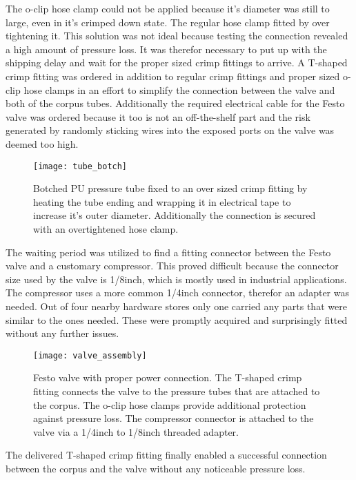 The o-clip hose clamp could not be applied because it's diameter was still to large, even in it's crimped down state. The regular hose clamp fitted by over tightening it. This solution was not ideal because testing the connection revealed a high amount of pressure loss. It was therefor necessary to put up with the shipping delay and wait for the proper sized crimp fittings to arrive. A T-shaped crimp fitting was ordered in addition to regular crimp fittings and proper sized o-clip hose clamps in an effort to simplify the connection between the valve and both of the corpus tubes. Additionally the required electrical cable for the Festo valve was ordered because it too is not an off-the-shelf part and the risk generated by randomly sticking wires into the exposed ports on the valve was deemed too high.


\begin{figure}[h]
\centering

\texttt{[image: tube\_botch]}

\caption{Botched PU pressure tube fixed to an over sized crimp fitting by heating the tube ending and wrapping it in electrical tape to increase it's outer diameter. Additionally the connection is secured with an overtightened hose clamp.}
\end{figure}

The waiting period was utilized to find a fitting connector between the Festo valve and a customary compressor. This proved difficult because the connector size used by the valve is 1/8inch, which is mostly used in industrial applications. The compressor uses a more common 1/4inch connector, therefor an adapter was needed. Out of four nearby hardware stores only one carried any parts that were similar to the ones needed. These were promptly acquired and surprisingly fitted without any further issues.

\begin{figure}[h]
\centering

\texttt{[image: valve\_assembly]}

\caption{Festo valve with proper power connection. The T-shaped crimp fitting connects the valve to the pressure tubes that are attached to the corpus. The o-clip hose clamps provide additional protection against pressure loss. The compressor connector is attached to the valve via a 1/4inch to 1/8inch threaded adapter.}
\end{figure}

The delivered T-shaped crimp fitting finally enabled a successful connection between the corpus and the valve without any noticeable pressure loss.  


